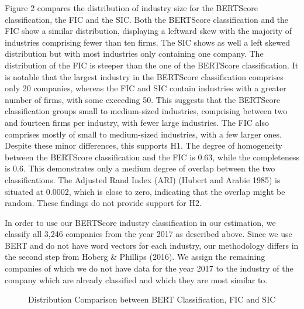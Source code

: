 \documentclass[
]{article}
\begin{document}
Figure 2 compares the distribution of industry size for the BERTScore
classification, the FIC and the SIC. Both the BERTScore classification
and the FIC show a similar distribution, displaying a leftward skew with
the majority of industries comprising fewer than ten firms. The SIC
shows as well a left skewed distribution but with most industries only
containing one company. The distribution of the FIC is steeper than the
one of the BERTScore classification. It is notable that the largest
industry in the BERTScore classification comprises only 20 companies,
whereas the FIC and SIC contain industries with a greater number of
firms, with some exceeding 50. This suggests that the BERTScore
classification groups small to medium-sized industries, comprising
between two and fourteen firms per industry, with fewer large
industries. The FIC also comprises mostly of small to medium-sized
industries, with a few larger ones. Despite these minor differences,
this supports H1. The degree of homogeneity between the BERTScore
classification and the FIC is 0.63, while the completeness is 0.6. This
demonstrates only a medium degree of overlap between the two
classifications. The Adjusted Rand Index (ARI) (Hubert and Arabie 1985)
is situated at 0.0002, which is close to zero, indicating that the
overlap might be random. These findings do not provide support for H2.

In order to use our BERTScore industry classification in our estimation,
we classify all 3,246 companies from the year 2017 as described above.
Since we use BERT and do not have word vectors for each industry, our
methodology differs in the second step from Hoberg \& Phillips (2016).
We assign the remaining companies of which we do not have data for the
year 2017 to the industry of the company which are already classified
and which they are most similar to.

\begin{figure}


\caption{\label{fig-2}Distribution Comparison between BERT
Classification, FIC and SIC}

\end{figure}%
\end{document}
